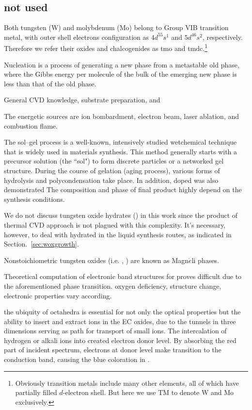 \subsection{not used}
Both tungsten (W) and molybdenum (Mo) belong to Group VIB transition metal, with outer shell electrons configuration as $4d^55s^1$ and $5d^46s^2$, respectively. Therefore we refer their oxides and chalcogenides as \gls{tmo} and \gls{tmdc}.\footnote{Obviously transition metals include many other elements, all of which have partially filled $d$-electron shell. But here we use TM to denote W and Mo exclusively.}

Nucleation is a process of generating a new phase from a metastable old phase, where the Gibbs energy per molecule of the bulk of the emerging new phase is less than that of the old phase.

General CVD knowledge, substrate preparation, and\cite{MichealK.Zuraw2003}


The energetic sources are ion bombardment, electron beam, laser ablation, and combustion flame\cite{Rao2011}.

The sol–gel process is a well-known, intensively studied wetchemical technique that is widely used in materials synthesis. This method generally starts with a precursor solution (the ``sol") to form discrete particles or a networked gel structure. During the course of gelation (aging process), various forms of hydrolysis and polycondensation take place.
In addition, doped  was also demonstrated
The composition and phase of final product highly depend on the synthesis conditions.

We do not discuss tungsten oxide hydrates () in this work since the product of thermal CVD approach is not plagued with this complexity. It's necessary, however, to deal with hydrated  in the liquid synthesis routes, as indicated in Section.~\ref{sec:woxgrowth}.


Nonstoichiometric tungsten oxides  (i.e. , ) are known as Magn$\acute{e}$li phases.


Theoretical computation of electronic band structures for  proves difficult due to the aforementioned phase transition. oxygen deficiency, structure change, electronic properties vary according.

the ubiquity of  octahedra is essential for not only the optical properties but the ability to insert and extract ions in the EC oxides, due to the tunnels in three dimensions serving as path for transport of small ions. The intercalation of hydrogen or alkali ions into  created electron donor level. By absorbing the red part of incident spectrum, electrons at donor level make transition to the conduction band, causing the blue coloration in .

